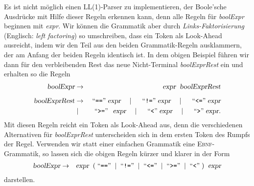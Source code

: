 \noindent
Es ist nicht m\"oglich einen LL(1)-Parser zu implementieren, der Boole'sche Ausdr\"ucke
mit Hilfe dieser Regeln  erkennen kann, denn alle Regeln f\"ur \textsl{boolExpr} beginnen
mit \textsl{expr}.  Wir k\"onnen die Grammatik aber durch \emph{Links-Faktorisierung}
(Englisch: \emph{left factoring})  
so umschreiben, dass ein Token als Look-Ahead ausreicht, indem wir den Teil aus den beiden 
Grammatik-Regeln ausklammern, der am Anfang der beiden Regeln identisch ist.  In dem
obigen Beispiel f\"uhren wir dann f\"ur den verbleibenden Rest das neue Nicht-Terminal
\textsl{boolExprRest} ein und erhalten so die Regeln
\begin{eqnarray*}
\textsl{boolExpr}     & \rightarrow & \;\textsl{expr} \;\;\textsl{boolExprRest} \\[0.2cm]
\textsl{boolExprRest} & \rightarrow & \;\mbox{``\texttt{==}''}\;    \textsl{expr} \quad \mid \quad \;\mbox{``\texttt{!=}''}\; \textsl{expr}
                                      \quad \mid \quad \;\mbox{``\texttt{<=}''}\; \textsl{expr}                                  \\
                      & \mid        & \;\mbox{``\texttt{>=}''}\;\;\, \textsl{expr} \quad \mid \quad \;\mbox{``\texttt{<}''}\; \textsl{expr} 
                                      \quad \mid \quad \;\mbox{``\texttt{>}''}\; \textsl{expr}. 
\end{eqnarray*}
Mit diesen Regeln reicht ein Token als Look-Ahead aus, denn die verschiedenen Alternativen f\"ur 
\mbox{\textsl{boolExprRest}} unterscheiden sich in dem ersten Token des Rumpfs der Regel.
Verwenden wir statt einer einfachen Grammatik eine \textsc{Ebnf}-Grammatik, so lassen sich die 
obigen Regeln k\"urzer und klarer in der Form
\begin{eqnarray*}
\textsl{boolExpr} & \rightarrow & \textsl{expr}\;\;
                                  (\;\mbox{``\texttt{==}''}\;\mid \;\mbox{``\texttt{!=}''}\;\mid \;\mbox{``\texttt{<=}''}\; \mid \;\mbox{``\texttt{>=}''}\; \mid \;\mbox{``\texttt{<}''}\;)  
                                  \;\;\textsl{expr} 
\end{eqnarray*}
darstellen.

